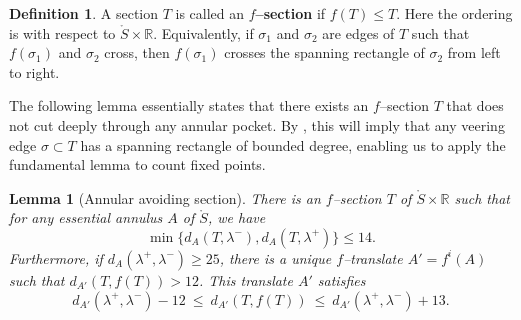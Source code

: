 \documentclass[11pt,letterpaper]{amsart}
\newcommand{\RR}[0]{\mathbb{R}}
\newcommand{\mr}{\mathring}
\newcommand{\bdy}{\partial} %
\numberwithin{equation}{section}
\newtheorem{lemma}[theorem]{Lemma}
\theoremstyle{definition}
\newtheorem{definition}[theorem]{Definition}
\newcommand{\define}[1]{\textbf{#1}}
\begin{document}
%    
%    


\begin{definition}
A section $T$ is called an \define{$f$--section} if $f(T) \leq T$. Here the ordering is with respect to $\mr S \times \RR$. Equivalently, if $\sigma_1$ and $\sigma_2$ are edges of $T$ such that $f(\sigma_1)$ and $\sigma_2$ cross, then $f(\sigma_1)$ crosses the spanning rectangle of $\sigma_2$ from left to right. 
\end{definition}

\smallskip
The following lemma essentially states that there exists an $f$--section $T$ that does not cut deeply through any annular pocket.
By , this will imply that any veering edge $\sigma \subset T$ has a spanning rectangle of bounded degree, enabling us to apply the fundamental lemma to count fixed points.



\begin{lemma}[Annular avoiding section]\label{Lem:AnnularAvoiding}
There is an $f$--section $T$ of $\mr S \times \RR$ such that for any essential annulus $A$ of $\mr S$, we have
\begin{equation}\label{Eqn:CloseToLamAnnular}
\min \big\{ d_A(T, \lambda^-), d_A(T, \lambda^+) \big\} \leq 14.
\end{equation}
Furthermore, if $d_{A}(\lambda^+,\lambda^-)\geq 25$, there is a unique $f$--translate $A' = f^i(A)$ such  that $d_{A'}(T, f(T)) > 12$. This translate $A'$ satisfies
\begin{equation}\label{Eqn:SimilarDistAnnular}
 d_{A'}(\lambda^+,\lambda^-) -12 \: \leq \: d_{A'}(T, f(T)) \: \leq \: d_{A'}(\lambda^+,\lambda^-) +13.
\end{equation}
\end{lemma}
\end{document}
